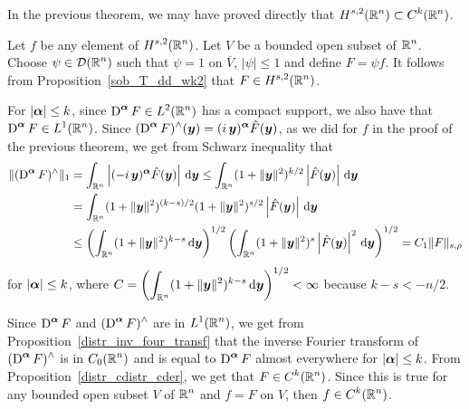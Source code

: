 \begin{rmk}
In the previous theorem, we may have proved directly that 
$\displaystyle H^{s,2}(\mathbb{R}^n) \subset C^k(\mathbb{R}^n)$.

Let $f$ be any element of $\displaystyle H^{s,2}(\mathbb{R}^n)$.  Let $V$ be
a bounded open subset of $\displaystyle \mathbb{R}^n$.  Choose
$\displaystyle \psi \in \mathcal{D}(\mathbb{R}^n)$ such that
$\psi = 1$ on $\overline{V}$,  $|\psi|\leq 1$ and define $F = \psi f$.
It follows from Proposition~\ref{sob_T_dd_wk2} that
$\displaystyle F \in H^{s,2}(\mathbb{R}^n)$.

For $|{\bm{\alpha}}|\leq k$, since
$\displaystyle \operatorname{D}^{{\bm{\alpha}}} F \in L^2(\mathbb{R}^n)$
has a compact support, we also have that
$\displaystyle \operatorname{D}^{{\bm{\alpha}}} F \in L^1(\mathbb{R}^n)$.
Since $\displaystyle (\operatorname{D}^{{\bm{\alpha}}} F)^\wedge({\bm{y}}) =
(i\,{\bm{y}})^{{\bm{\alpha}}} \hat{F}({\bm{y}})$, as we did for $f$ in the proof
of the previous theorem, we get from Schwarz inequality that
\begin{align*}
\| (\operatorname{D}^{{\bm{\alpha}}} F)^\wedge \|_1 &= 
\int_{\mathbb{R}^n} \left| (-i\,{\bm{y}})^{{\bm{\alpha}}} \hat{F}({\bm{y}}) \right|
\,\mathrm{d}{{\bm{y}}}
\leq \int_{\mathbb{R}^n} (1+\|{\bm{y}}\|^2)^{k/2} \left| \hat{F}({\bm{y}}) \right|
\,\mathrm{d}{{\bm{y}}} \\
& = \int_{\mathbb{R}^n} (1+\|{\bm{y}}\|^2)^{(k-s)/2}
 (1+\|{\bm{y}}\|^2)^{s/2} \left| \hat{F}({\bm{y}}) \right| \,\mathrm{d}{{\bm{y}}} \\
&\leq \left( \int_{\mathbb{R}^n} (1+\|{\bm{y}}\|^2)^{k-s} \,\mathrm{d}{{\bm{y}}} \right)^{1/2}
 \left(\int_{\mathbb{R}^n} (1+\|{\bm{y}}\|^2)^s \left|\hat{F}({\bm{y}}) \right|^2
\,\mathrm{d}{{\bm{y}}}\right)^{1/2}
= C_1 \| F \|_{s,\rho}
\end{align*}
for $|{\bm{\alpha}}|\leq k$, where
$\displaystyle
C = \left( \int_{\mathbb{R}^n} (1+\|{\bm{y}}\|^2)^{k-s} \,\mathrm{d}{{\bm{y}}} \right)^{1/2}
< \infty$ because $k-s < -n/2$.

Since
$\displaystyle \operatorname{D}^{{\bm{\alpha}}} F$ and
$\displaystyle (\operatorname{D}^{{\bm{\alpha}}} F)^\wedge$
are in $\displaystyle L^1(\mathbb{R}^n)$, we
get from Proposition~\ref{distr_inv_four_transf} that the inverse Fourier
transform of $\displaystyle (\operatorname{D}^{{\bm{\alpha}}} F)^\wedge$ is in
$\displaystyle C_0(\mathbb{R}^n)$
and is equal to $\displaystyle \operatorname{D}^{{\bm{\alpha}}} F$ almost everywhere
for $|{\bm{\alpha}}| \leq k$.  From Proposition~\ref{distr_cdistr_cder}, we
get that $\displaystyle F\in C^k(\mathbb{R}^n)$.  Since this is true for any
bounded open subset $V$ of $\displaystyle \mathbb{R}^n$ and $f=F$ on $V$, then
$\displaystyle f\in C^k(\mathbb{R}^n)$.
\end{rmk}


